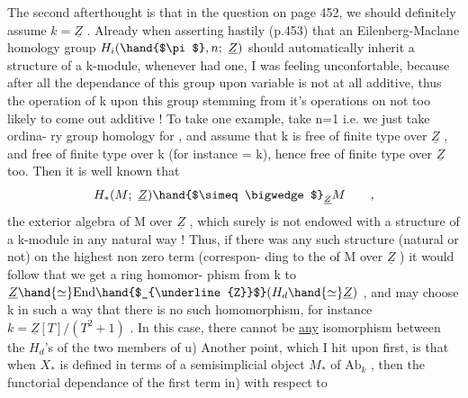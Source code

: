 The second afterthought is  that in the question on page 452,  we
should definitely assume $k=\underline{Z}$ .  Already when asserting hastily (p.453)
that an Eilenberg-Maclane homology group $H_i(\hand{$\pi$},n;\ \underline{Z})$  should automatically
inherit a structure of a k-module,  whenever \hand{$\pi$} had one,  I was feeling
unconfortable,  because after all the dependance of this group upon
variable \hand{$\pi$} is not at all additive,  thus the operation of k upon this
group stemming from it's operations on \hand{$\pi$}   not too likely to come
out additive !  To take one example,  take n=1 i.e. we just take ordina-%
ry group homology for \hand{$\pi$} ,  and assume that k is free of finite type over
$\underline{Z}$ ,  and \hand{$\pi$} free of finite type over k (for instance = k),  hence free
of finite type over $\underline{Z}$ too.  Then it is well known that
\[ H_*(M;\ \underline{Z})\hand{$\simeq \bigwedge$}_{\underline{Z}}M \qquad , \]
the exterior algebra of M  over $\underline{Z}$ ,  which surely is not endowed with a
structure of a k-module in any natural way !  Thus,  if there was any
such structure (natural or not) on the highest non zero term (correspon-%
ding to the  of M over $\underline{Z}$ )\hand{,} it would follow that we get a ring homomor-%
phism  from  k to  $\underline{Z}\hand{\simeq} \mathrm{End}\hand{$_{\underline{Z}}$}(H_d\hand{\simeq} \underline{Z})$ ,  and  may choose k in such a
way that there is no such homomorphism,  for instance  $k = \underline{Z}[T]/(T^2+1)$ .
In this case,  there cannot be \uline{any} isomorphism  between the $H_d$'s of the
two members of \hand{(}u)  Another point,  which I hit upon first,  is that
when  $X_*$  is defined in terms of a semisimplicial object $M_*$ of $\mathrm{Ab}_k$ ,
then the functorial dependance of the first term in) with respect to


